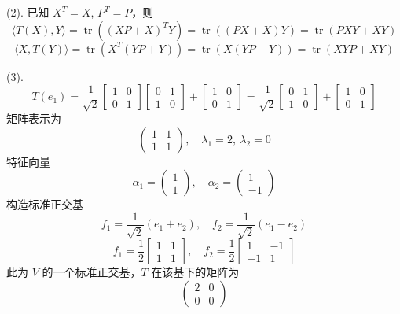 \documentclass{article}
\begin{document}
(2). 已知 \( X^T = X \), \( P^T = P \)，则
\[
\langle T(X), Y \rangle
= \operatorname{tr}\left( (XP + X)^T Y \right)
= \operatorname{tr}\left( (PX + X)Y \right)
= \operatorname{tr}\left( PXY + XY \right)
\]
\[
\langle X, T(Y) \rangle
= \operatorname{tr}\left( X^T (YP + Y) \right)
= \operatorname{tr}\left( X(YP + Y) \right)
= \operatorname{tr}\left( XYP + XY \right)
\]

(3).
\[
T(e_1) = \frac{1}{\sqrt{2}} \begin{bmatrix} 1 & 0 \\ 0 & 1 \end{bmatrix} \begin{bmatrix} 0 & 1 \\ 1 & 0 \end{bmatrix} + \begin{bmatrix} 1 & 0 \\ 0 & 1 \end{bmatrix}
= \frac{1}{\sqrt{2}} \begin{bmatrix} 0 & 1 \\ 1 & 0 \end{bmatrix} + \begin{bmatrix} 1 & 0 \\ 0 & 1 \end{bmatrix}
\]
矩阵表示为
\[
\begin{pmatrix} 1 & 1 \\ 1 & 1 \end{pmatrix}, \quad
\lambda_1 = 2,\ \lambda_2 = 0
\]
特征向量
\[
\alpha_1 = \begin{pmatrix} 1 \\ 1 \end{pmatrix}, \quad
\alpha_2 = \begin{pmatrix} 1 \\ -1 \end{pmatrix}
\]
构造标准正交基
\[
f_1 = \frac{1}{\sqrt{2}} (e_1 + e_2), \quad
f_2 = \frac{1}{\sqrt{2}} (e_1 - e_2)
\]
\[
f_1 = \frac{1}{2} \begin{bmatrix} 1 & 1 \\ 1 & 1 \end{bmatrix}, \quad
f_2 = \frac{1}{2} \begin{bmatrix} 1 & -1 \\ -1 & 1 \end{bmatrix}
\]
此为 \( V \) 的一个标准正交基，\( T \) 在该基下的矩阵为
\[
\begin{pmatrix} 2 & 0 \\ 0 & 0 \end{pmatrix}
\]
\end{document}
